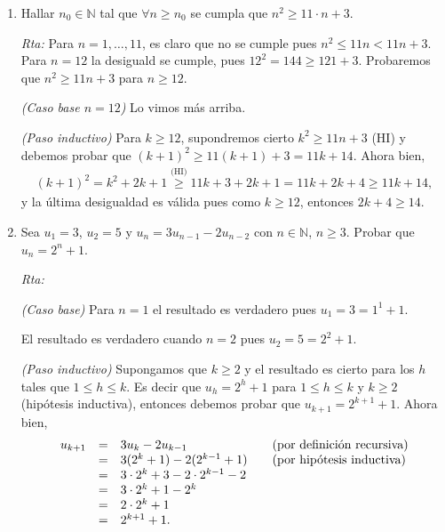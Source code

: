 \documentclass[a4paper,12pt,twoside,spanish,reqno]{amsbook}
\numberwithin{equation}{section}
\newcommand{\rta}{\noindent\textit{Rta: }}
\begin{document}
\begin{enumerate}
        
        \item Hallar $n_0 \in {\mathbb N}$ tal que $\forall n \ge n_0$ se cumpla que $n^2 \ge 11 \cdot n + 3$.
        
        \rta Para $n=1,\ldots,11$,  es claro que no se cumple pues $n^2 \le 11n < 11n +3$. Para $n =12$ la desiguald se cumple, pues $12^2 = 144 \ge 121+3$.   Probaremos  que $n^2 \ge 11  n + 3$ para $n\ge 12$. 
        
            \textit{(Caso base $n=12$) } Lo vimos más arriba.
            
            \textit{(Paso inductivo) }  Para  $k \ge 12$,  supondremos cierto $k^2 \ge 11  n + 3$ (HI) y debemos probar que $(k+1)^2 \ge 11  (k+1) + 3 =11k +14$. Ahora bien, 
            \begin{align*}
                (k+1)^2 = k^2+2k+1 \overset{\text{(HI)}}{\ge} 11k+3 +2k+1 = 11k + 2k+ 4 \ge 11k +14, 
            \end{align*}
            y la última desigualdad es válida pues como  $k\ge 12$,  entonces $2k+ 4 \ge 14$.
        
        
        \item Sea $u_1=3$, $u_2=5$ y $u_n=3 u_{n-1} - 2 u_{n-2}$ con $n\in \mathbb N$, $n\geq 3$.
        Probar que $u_n=2^n+1$.
        
        \rta
        
        \textit{(Caso  base) }  Para $n=1$ el resultado es verdadero pues $u_1 =3 = 1^1 +1$. 
        
        El resultado es verdadero cuando  $n=2$ pues $u_2 = 5 =2^2+1$.
        
        {\it (Paso  inductivo)} Supongamos que $k \ge 2$ y el resultado  es cierto para los $h$ tales que  $1 \le h \le k$. Es decir que $u_h = 2^h+1$ para $1 \le h \le k$ y $k \ge 2$ (hipótesis inductiva),  entonces debemos probar que $u_{k+1} = 2^{k+1}+1$. Ahora bien, 
        $$
        \begin{matrix} u_{k+1} &=& 3u_k -2u_{k-1} \hfill &\quad \text{(por definición recursiva)} \hfill \\
        &=& 3(2^k+1)-2(2^{k-1}+1) \hfill &\quad \text{(por hipótesis inductiva})\hfill \\
        &=& 3\cdot 2^k+3-2\cdot 2^{k-1}-2 \hfill & \\
        &=& 3\cdot 2^k+1- 2^{k} \hfill & \\
        &=& 2\cdot 2^k+1 \hfill & \\
        &=& 2^{k+1}+1. \hfill & 
        \end{matrix}
        $$


\end{enumerate}
\end{document}
